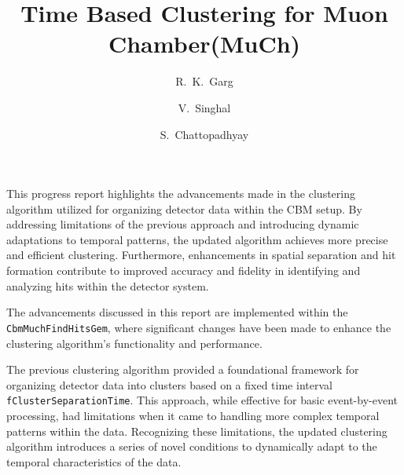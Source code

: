 \documentclass{CBM-PR-2019}
\begin{document}
\title{ 
Time Based Clustering for Muon Chamber(MuCh)
}

\author[2]{R.~K.~Garg}
\author[1]{V.~Singhal}
\author[1]{S.~Chattopadhyay}


\maketitle


This progress report highlights the advancements made in the clustering algorithm utilized for organizing detector data within the CBM setup. By addressing limitations of the previous approach and introducing dynamic adaptations to temporal patterns, the updated algorithm achieves more precise and efficient clustering. Furthermore, enhancements in spatial separation and hit formation contribute to improved accuracy and fidelity in identifying and analyzing hits within the detector system.

The advancements discussed in this report are implemented within the \texttt{CbmMuchFindHitsGem}, where significant changes have been made to enhance the clustering algorithm's functionality and performance.


The previous clustering algorithm provided a foundational framework for organizing detector data into clusters based on a fixed time interval \texttt{fClusterSeparationTime}. This approach, while effective for basic event-by-event processing, had limitations when it came to handling more complex temporal patterns within the data. Recognizing these limitations, the updated clustering algorithm introduces a series of novel conditions to dynamically adapt to the temporal characteristics of the data.
\end{document}
